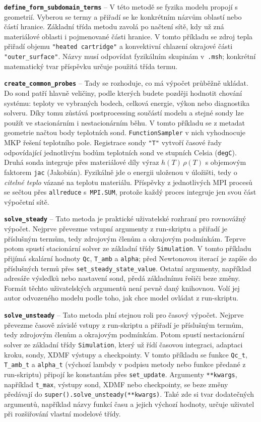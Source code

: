\documentclass[a4paper,11pt]{article}
\begin{document}
\textbf{\texttt{define\_form\_subdomain\_terms}} -- V této metodě se fyzika modelu
propojí s geometrií. Vyberou se termy a přiřadí se ke konkrétním názvům oblastí
nebo částí hranice. Základní třída metodu zavolá po načtení sítě, kdy už zná
materiálové oblasti i pojmenované části hranice. V tomto příkladu se zdroj tepla
přiřadí objemu \texttt{"heated cartridge"} a konvektivní chlazení okrajové části
\texttt{"outer\_surface"}. Názvy musí odpovídat fyzikálním skupinám v~\texttt{.msh};
konkrétní matematický tvar příspěvku určuje použitá třída termu.

\textbf{\texttt{create\_common\_probes}} -- Tady se rozhoduje, co má výpočet
průběžně ukládat. Do sond patří hlavně veličiny, podle kterých budete později
hodnotit chování systému: teploty ve vybraných bodech, celková energie, výkon
nebo diagnostika solveru. Díky tomu zůstává postprocessing součástí modelu a
stejné sondy lze použít ve stacionárním i nestacionárním běhu.
V tomto příkladu se z metadat geometrie načtou body teplotních sond.
\texttt{FunctionSampler} v nich vyhodnocuje MKP řešení teplotního pole.
Registrace sondy \texttt{"T"} vytvoří časové řady odpovídající jednotlivým
bodům teplotních sond ve stupních Celsia (\texttt{degC}). Druhá sonda integruje
přes materiálové díly výraz $h(T)\,\rho(T)$ s objemovým faktorem \texttt{jac}
(Jakobián). Fyzikálně jde o energii uloženou v úložišti, tedy o \emph{citelné
teplo} vázané na teplotu materiálu. Příspěvky z jednotlivých MPI procesů se
sečtou přes \texttt{allreduce} s~\texttt{MPI.SUM}, protože každý proces integruje
jen svou část výpočetní sítě.

\textbf{\texttt{solve\_steady}} -- Tato metoda je praktické uživatelské rozhraní
pro rovnovážný výpočet. Nejprve převezme vstupní argumenty z run-skriptu a
přiřadí je příslušným termům, tedy zdrojovým členům a okrajovým podmínkám.
Teprve potom spustí stacionární solver ze základní třídy \texttt{Simulation}.
V tomto příkladu přijímá skalární hodnoty \texttt{Qc}, \texttt{T\_amb} a
\texttt{alpha}; před Newtonovou iterací je zapíše do příslušných termů přes
\texttt{set\_steady\_state\_value}. Ostatní argumenty, například adresáře
výsledků nebo nastavení sond, předá základnímu řešiči beze změny.
Formát těchto uživatelských argumentů není pevně daný knihovnou. Volí jej autor
odvozeného modelu podle toho, jak chce model ovládat z run-skriptu.

\textbf{\texttt{solve\_unsteady}} -- Tato metoda plní stejnou roli pro časový
výpočet. Nejprve převezme časově závislé vstupy z run-skriptu a přiřadí je
příslušným termům, tedy zdrojovým členům a okrajovým podmínkám. Potom spustí
nestacionární solver ze základní třídy \texttt{Simulation}, který už řídí
časovou integraci, adaptaci kroku, sondy, XDMF výstupy a checkpointy. V tomto
příkladu se funkce \texttt{Qc\_t}, \texttt{T\_amb\_t} a \texttt{alpha\_t}
(výchozí lambdy v podpisu metody nebo funkce předané z run-skriptu) připojí ke
konstantám přes \texttt{set\_update}. Argumenty \texttt{**kwargs}, například
\texttt{t\_max}, výstupy sond, XDMF nebo checkpointy, se beze změny předávají do
\texttt{super().solve\_unsteady(**kwargs)}. Také zde si tvar dodatečných
argumentů, například názvy funkcí času a jejich výchozí hodnoty, určuje uživatel
při rozšiřování vlastní modelové třídy.
\end{document}
